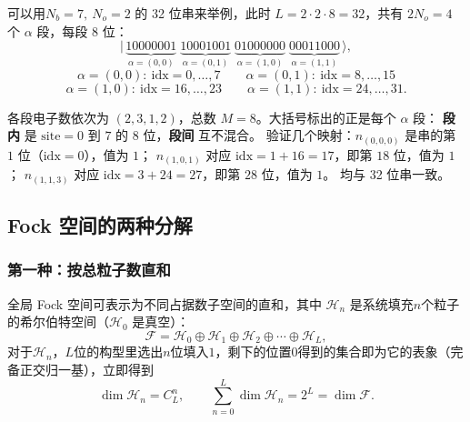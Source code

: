 \documentclass[11pt]{ctexart}
\begin{document}
可以用$N_b=7,\ N_o=2$ 的 32 位串来举例，此时 $L=2\cdot 2\cdot 8=32$，共有 $2N_o=4$ 个 $\alpha$ 段，每段 $8$ 位：
\[
|\,\underbrace{10000001}_{\alpha=(0,0)}\;
 \underbrace{10001001}_{\alpha=(0,1)}\;
 \underbrace{01000000}_{\alpha=(1,0)}\;
 \underbrace{00011000}_{\alpha=(1,1)}\,\rangle,
\]
\[
\alpha=(0,0):\ \mathrm{idx}=0,\dots,7 \qquad
\alpha=(0,1):\ \mathrm{idx}=8,\dots,15
\]
\[
\alpha=(1,0):\ \mathrm{idx}=16,\dots,23 \qquad
\alpha=(1,1):\ \mathrm{idx}=24,\dots,31 .
\]

各段电子数依次为 $(2,3,1,2)$，总数 $M=8$。大括号标出的正是每个 $\alpha$ 段：
\textbf{段内} 是 $\mathrm{site}=0$ 到 $7$ 的 8 位，\textbf{段间} 互不混合。
验证几个映射：$n_{(0,0,0)}$ 是串的第 $1$ 位（$\mathrm{idx}=0$），值为 $1$；
$n_{(1,0,1)}$ 对应 $\mathrm{idx}=1+16=17$，即第 $18$ 位，值为 $1$；
$n_{(1,1,3)}$ 对应 $\mathrm{idx}=3+24=27$，即第 $28$ 位，值为 $1$。
均与 32 位串一致。

\subsection{Fock 空间的两种分解}

\subsubsection{第一种：按总粒子数直和}

全局 Fock 空间可表示为不同占据数子空间的直和，其中 $\mathcal{H}_n$ 是系统填充$n$个粒子的希尔伯特空间（$\mathcal{H}_0$ 是真空）：
\begin{equation*}    \mathcal{F}=\mathcal{H}_0\oplus\mathcal{H}_1\oplus\mathcal{H}_2\oplus\cdots\oplus\mathcal{H}_L,
\end{equation*}
对于$\mathcal{H}_n$，$L$位的构型里选出$n$位填入$1$，剩下的位置$0$得到的集合即为它的表象（完备正交归一基），立即得到
\[
\dim\mathcal{H}_n=C_L^n,\qquad
\sum_{n=0}^{L}\dim\mathcal{H}_n=2^L=\dim\mathcal{F}.
\]
\end{document}

